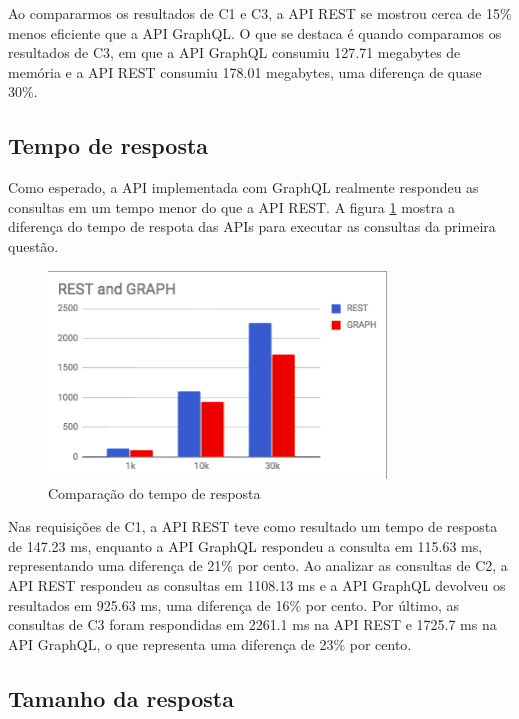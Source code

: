 Ao compararmos os resultados de C1 e C3, a API REST se mostrou cerca de 15\% menos eficiente que a API GraphQL. O que se destaca é quando comparamos os resultados de C3, em que a API GraphQL consumiu 127.71 megabytes de memória e a API REST consumiu 178.01 megabytes, uma diferença de quase 30\%.

\subsection{Tempo de resposta}

Como esperado, a API implementada com GraphQL realmente respondeu as consultas em um tempo menor do que a API REST. A figura \ref{fig:q1-time} mostra a diferença do tempo de respota das APIs para executar as consultas da primeira questão.

\begin{figure}[htbp]
    \centering
    \includegraphics[width=0.8\textwidth]{figuras/Q1-result-request-time.png}
    \caption{Comparação do tempo de resposta}
    \label{fig:q1-time}
    \author{fonte: Autor}
\end{figure}

Nas requisições de C1, a API REST teve como resultado um tempo de resposta de 147.23 ms, enquanto a API GraphQL respondeu a consulta em 115.63 ms, representando uma diferença de 21\% por cento. Ao analizar as consultas de C2, a API REST respondeu as consultas em 1108.13 ms e a API GraphQL devolveu os resultados em 925.63 ms, uma diferença de 16\% por cento. Por último, as consultas de C3 foram respondidas em 2261.1 ms na API REST e 1725.7 ms na API GraphQL, o que representa uma diferença de 23\% por cento.

\subsection{Tamanho da resposta}

